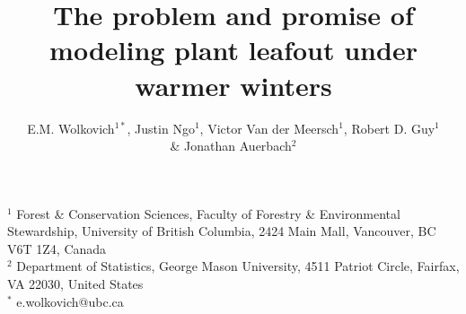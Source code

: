 \documentclass[11pt]{article}
\begin{document}
\renewcommand{\refname}{\CHead{}}


\title{The problem and promise of \\ modeling plant leafout under warmer winters} %
\author{E.M. Wolkovich$^{1*}$, Justin Ngo$^1$, Victor Van der Meersch$^1$, Robert D. Guy$^1$ \\ \& Jonathan Auerbach$^2$} %
\maketitle


$^1$ Forest \& Conservation Sciences, Faculty of Forestry \& Environmental Stewardship, University of British Columbia, 2424 Main Mall, Vancouver, BC V6T 1Z4, Canada\\
$^2$ Department of Statistics, George Mason University, 4511 Patriot Circle, Fairfax, VA 22030, United States\\
$^*$ e.wolkovich@ubc.ca
\end{document}
